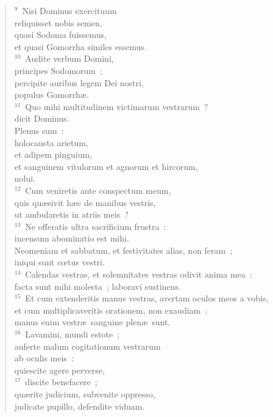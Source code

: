 \begin{verse}
${}^{9}$~Nisi Dominus exercituum\\ reliquisset nobis semen,\\ quasi Sodoma fuissemus,\\ et quasi Gomorrha similes essemus.\\
${}^{10}$~Audite verbum Domini,\\ principes Sodomorum~;\\ percipite auribus legem Dei nostri,\\ populus Gomorrh\ae .\\
${}^{11}$~Quo mihi multitudinem victimarum vestrarum~?\\ dicit Dominus.\\ Plenus sum~:\\ holocausta arietum,\\ et adipem pinguium,\\ et sanguinem vitulorum et agnorum et hircorum,\\ nolui.\\
${}^{12}$~Cum veniretis ante conspectum meum,\\ quis qu\ae sivit h\ae c de manibus vestris,\\ ut ambularetis in atriis meis~?\\
${}^{13}$~Ne offeratis ultra sacrificium frustra~:\\ incensum abominatio est mihi.\\ Neomeniam et sabbatum, et festivitates alias, non feram~;\\ iniqui sunt cœtus vestri.\\
${}^{14}$~Calendas vestras, et solemnitates vestras odivit anima mea~:\\ facta sunt mihi molesta~; laboravi sustinens.\\
${}^{15}$~Et cum extenderitis manus vestras, avertam oculos meos a vobis,\\ et cum multiplicaveritis orationem, non exaudiam~:\\ manus enim vestr\ae\ sanguine plen\ae\ sunt.\\
${}^{16}$~Lavamini, mundi estote~;\\ auferte malum cogitationum vestrarum\\ ab oculis meis~:\\ quiescite agere perverse,\\
${}^{17}$~discite benefacere~;\\ qu\ae rite judicium, subvenite oppresso,\\ judicate pupillo, defendite viduam.\end{verse}


